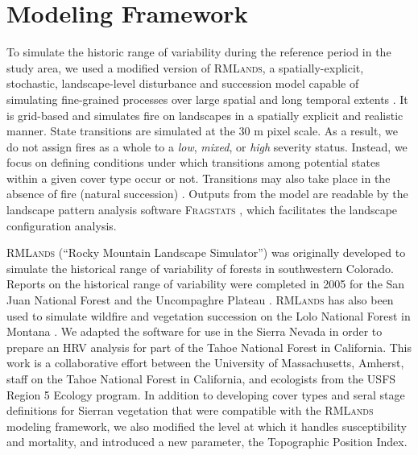 \section{Modeling Framework}

To simulate the historic range of variability during the reference period in the study area, we used a modified version of \textsc{RMLands}, a spatially-explicit, stochastic, landscape-level disturbance and succession model capable of simulating fine-grained processes over large spatial and long temporal extents \citep{McGarigal2005}. It is grid-based and simulates fire on landscapes in a spatially explicit and realistic manner. State transitions are simulated at the 30 m pixel scale. As a result, we do not assign fires as a whole to a \emph{low}, \emph{mixed}, or \emph{high} severity status. Instead, we focus on defining conditions under which transitions among potential states within a given cover type occur or not. Transitions may also take place in the absence of fire (natural succession) \citep{McGarigal2012}. Outputs from the model are readable by the landscape pattern analysis software \textsc{Fragstats} \citep{Fragstats2012}, which facilitates the landscape configuration analysis.

\textsc{RMLands} (``Rocky Mountain Landscape Simulator'') was originally developed to simulate the historical range of variability of forests in southwestern Colorado. Reports on the historical range of variability were completed in 2005 for the San Juan National Forest and the Uncompaghre Plateau \citep{McGarigal2005,McGarigal2005a}. \textsc{RMLands} has also been used to simulate wildfire and vegetation succession on the Lolo National Forest in Montana \citep{Cushman2011}. We adapted the software for use in the Sierra Nevada in order to prepare an HRV analysis for part of the Tahoe National Forest in California. This work is a collaborative effort between the University of Massachusetts, Amherst, staff on the Tahoe National Forest in California, and ecologists from the USFS Region 5 Ecology program. In addition to developing cover types and seral stage definitions for Sierran vegetation that were compatible with the \textsc{RMLands} modeling framework, we also modified the level at which it handles susceptibility and mortality, and introduced a new parameter, the Topographic Position Index.





